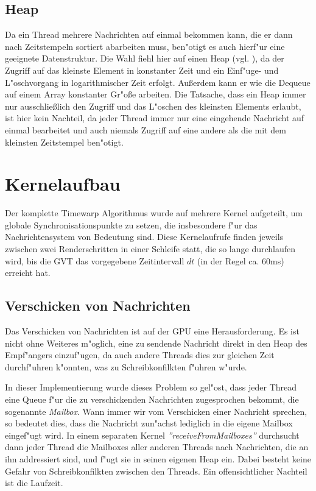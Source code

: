 \documentclass[a4paper, 10pt, openright, parskip, chapterprefix]{scrreprt}
\begin{document}
\subsection{Heap}
Da ein Thread mehrere Nachrichten auf einmal bekommen kann, die er dann nach Zeitstempeln sortiert abarbeiten muss,
ben"otigt es auch hierf"ur eine geeignete Datenstruktur. Die Wahl fiehl hier auf einen Heap (vgl. \cite{...}), da der
Zugriff auf das kleinste Element in konstanter Zeit und ein Einf"uge- und L"oschvorgang in logarithmischer Zeit erfolgt.
Au\ss erdem kann er wie die Dequeue auf einem Array konstanter Gr"o\ss e arbeiten.
Die Tatsache, dass ein Heap immer nur ausschlie\ss lich den Zugriff und das L"oschen des kleinsten Elements erlaubt, ist
hier kein Nachteil, da jeder Thread immer nur eine eingehende Nachricht auf einmal bearbeitet und auch niemals Zugriff auf eine
andere als die mit dem kleinsten Zeitstempel ben"otigt.

\section{Kernelaufbau}
\label{sec:Kernelaufbau}
Der komplette Timewarp Algorithmus wurde auf mehrere Kernel aufgeteilt, um globale Synchronisationspunkte zu setzen, die
insbesondere f"ur das Nachrichtensystem von Bedeutung sind. 
Diese Kernelaufrufe finden jeweils zwischen zwei Renderschritten in einer Schleife statt, die so lange durchlaufen wird,
bis die GVT das vorgegebene Zeitintervall $dt$ (in der Regel ca. 60ms) erreicht hat.

\subsection{Verschicken von Nachrichten}
\label{subsec:VerschickenVonNachrichten}
Das Verschicken von Nachrichten ist auf der GPU eine Herausforderung. Es ist nicht ohne Weiteres m"oglich, eine zu sendende
Nachricht direkt in den Heap des Empf"angers einzuf"ugen, da auch andere Threads dies zur gleichen Zeit durchf"uhren
k"onnten, was zu Schreibkonfilkten f"uhren w"urde.

In dieser Implementierung wurde dieses Problem so gel"ost, dass jeder Thread eine Queue f"ur die zu verschickenden
Nachrichten zugesprochen bekommt, die sogenannte \emph{Mailbox}. Wann immer wir vom Verschicken einer Nachricht
sprechen, so bedeutet dies, dass die Nachricht zun"achst lediglich in die eigene Mailbox eingef"ugt wird.
In einem separaten
Kernel \emph{''receiveFromMailboxes''} durchsucht dann jeder Thread die Mailboxes aller anderen Threads nach
Nachrichten, die an ihn addressiert sind,
und f"ugt sie in seinen eigenen Heap ein. Dabei besteht keine Gefahr von Schreibkonfilkten zwischen den Threads.
Ein offensichtlicher Nachteil ist die Laufzeit.
\end{document}
